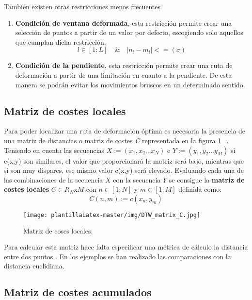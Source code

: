 También existen otras restricciones menos frecuentes 
\begin{enumerate}
    \item \textbf{Condición de ventana deformada}, esta restricción permite crear una selección de puntos a partir de un valor por defecto, escogiendo solo aquellos que cumplan dicha restricción. 
    \begin{equation}
        l \in [1:L] \quad \& \quad |n_l - m_l | <= (\sigma)
    \end{equation}
    \item \textbf{Condición de la pendiente}, esta restricción permite crear una ruta de deformación a partir de una limitación en cuanto a la pendiente. De esta manera se podrán evitar los movimientos bruscos en un determinado sentido.
\end{enumerate}


\subsection{Matriz de costes locales}

Para poder localizar una ruta de deformación óptima es necesaria la presencia de una matriz de distancias o matriz de costes \textit{C} representada en la figura \ref{fig:dtw3} ~\cite{zhang2020dynamic}. Teniendo en cuenta las secuencias $X:=(x_1, x_2 ... x_N)$ e $Y:=(y_1, y_2 ... y_M)$ si c(x,y) son similares, el valor que proporcionará la matriz será bajo, mientras que si son muy dispares, ese mismo valor c(x,y) será elevado. Evaluando cada una de las combinaciones de la secuencia $X$ con la secuencia $Y$ se consigue la \textbf{matriz de costes locales} $C \in R _N$x$M $ con $n \in [1:N]$ y $m \in [1:M]$ definida como:
\begin{equation}
C(n,m):=c(x_n,y_m)   
\end{equation}

\begin{figure}
    \centering
    \texttt{[image: plantillaLatex-master/img/DTW\_matrix\_C.jpg]}
    \caption{Matriz de coses locales.}
    \label{fig:dtw3}
\end{figure}

Para calcular esta matriz hace falta especificar una métrica de cálculo la distancia entre dos puntos \cite{jain2017optimal}. En los ejemplos se han realizado las comparaciones con la distancia euclidiana.

\subsection{Matriz de costes acumulados}

